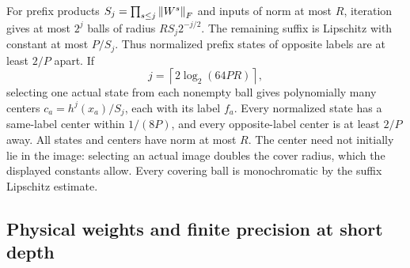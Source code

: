For prefix products $S_j=\prod_{s\le j}\left\lVert W^s\right\rVert_F$ and
inputs of norm at most $R$, iteration gives at most $2^j$ balls of
radius $RS_j2^{-j/2}$. The remaining suffix is Lipschitz with
constant at most $P/S_j$. Thus normalized prefix states of opposite
labels are at least $2/P$ apart. If
\[
 j=\left\lceil2\log_2(64PR)\right\rceil,
\]
selecting one actual state from each nonempty ball gives polynomially
many centers $c_a=h^j(x_a)/S_j$, each with its label $f_a$.
Every normalized state has a same-label center within $1/(8P)$,
and every opposite-label center is at least $2/P$ away. All states
and centers have norm at most $R$. The center need not initially lie
in the image: selecting an actual image doubles the cover radius,
which the displayed constants allow. Every covering ball is
monochromatic by the suffix Lipschitz estimate.

\subsection{Physical weights and finite precision at short depth}

